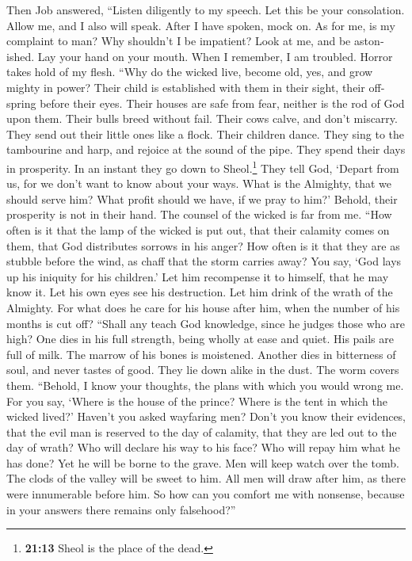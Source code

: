 \begin{paracol}{2}
\begin{otherlanguage}{english}
 Then Job answered,  ``Listen diligently to
my speech. Let this be your consolation.  Allow me, and I
also will speak. After I have spoken, mock on.  As for me,
is my complaint to man? Why shouldn't I be impatient? 
Look at me, and be astonished. Lay your hand on your mouth.
 When I remember, I am troubled. Horror takes hold of my
flesh.  ``Why do the wicked live, become old, yes, and
grow mighty in power?  Their child is established with
them in their sight, their offspring before their eyes. 
Their houses are safe from fear, neither is the rod of God upon them.
 Their bulls breed without fail. Their cows calve, and
don't miscarry.  They send out their little ones like a
flock. Their children dance.  They sing to the tambourine
and harp, and rejoice at the sound of the pipe.  They
spend their days in prosperity. In an instant they go down to
Sheol.\footnote{\textbf{21:13} Sheol is the place of the dead.}
 They tell God, `Depart from us, for we don't want to
know about your ways.  What is the Almighty, that we
should serve him? What profit should we have, if we pray to him?'
 Behold, their prosperity is not in their hand. The
counsel of the wicked is far from me.  ``How often is it
that the lamp of the wicked is put out, that their calamity comes on
them, that God distributes sorrows in his anger?  How
often is it that they are as stubble before the wind, as chaff that the
storm carries away?  You say, `God lays up his iniquity
for his children.' Let him recompense it to himself, that he may know
it.  Let his own eyes see his destruction. Let him drink
of the wrath of the Almighty.  For what does he care for
his house after him, when the number of his months is cut off?
 ``Shall any teach God knowledge, since he judges those
who are high?  One dies in his full strength, being
wholly at ease and quiet.  His pails are full of milk.
The marrow of his bones is moistened.  Another dies in
bitterness of soul, and never tastes of good.  They lie
down alike in the dust. The worm covers them.  ``Behold,
I know your thoughts, the plans with which you would wrong me.
 For you say, `Where is the house of the prince? Where is
the tent in which the wicked lived?'  Haven't you asked
wayfaring men? Don't you know their evidences,  that the
evil man is reserved to the day of calamity, that they are led out to
the day of wrath?  Who will declare his way to his face?
Who will repay him what he has done?  Yet he will be
borne to the grave. Men will keep watch over the tomb. 
The clods of the valley will be sweet to him. All men will draw after
him, as there were innumerable before him.  So how can
you comfort me with nonsense, because in your answers there remains only
falsehood?''


\end{otherlanguage}
\end{paracol}
